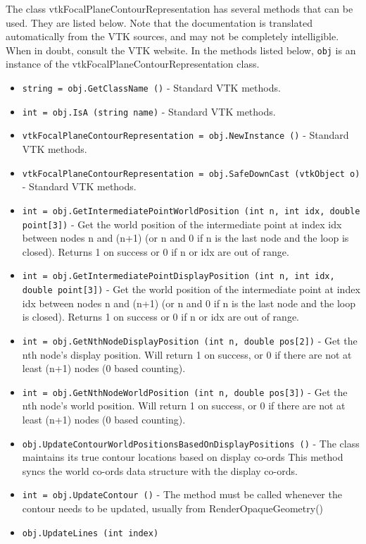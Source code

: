 The class vtkFocalPlaneContourRepresentation has several methods that can be used.
  They are listed below.
Note that the documentation is translated automatically from the VTK sources,
and may not be completely intelligible.  When in doubt, consult the VTK website.
In the methods listed below, \verb|obj| is an instance of the vtkFocalPlaneContourRepresentation class.
\begin{itemize}
\item  \verb|string = obj.GetClassName ()| -  Standard VTK methods.

\item  \verb|int = obj.IsA (string name)| -  Standard VTK methods.

\item  \verb|vtkFocalPlaneContourRepresentation = obj.NewInstance ()| -  Standard VTK methods.

\item  \verb|vtkFocalPlaneContourRepresentation = obj.SafeDownCast (vtkObject o)| -  Standard VTK methods.

\item  \verb|int = obj.GetIntermediatePointWorldPosition (int n, int idx, double point[3])| -  Get the world position of the intermediate point at
 index idx between nodes n and (n+1) (or n and 0 if
 n is the last node and the loop is closed). Returns
 1 on success or 0 if n or idx are out of range.

\item  \verb|int = obj.GetIntermediatePointDisplayPosition (int n, int idx, double point[3])| -  Get the world position of the intermediate point at
 index idx between nodes n and (n+1) (or n and 0 if
 n is the last node and the loop is closed). Returns
 1 on success or 0 if n or idx are out of range.

\item  \verb|int = obj.GetNthNodeDisplayPosition (int n, double pos[2])| -  Get the nth node's display position. Will return
 1 on success, or 0 if there are not at least 
 (n+1) nodes (0 based counting).

\item  \verb|int = obj.GetNthNodeWorldPosition (int n, double pos[3])| -  Get the nth node's world position. Will return
 1 on success, or 0 if there are not at least 
 (n+1) nodes (0 based counting).

\item  \verb|obj.UpdateContourWorldPositionsBasedOnDisplayPositions ()| -  The class maintains its true contour locations based on display co-ords
 This method syncs the world co-ords data structure with the display co-ords.

\item  \verb|int = obj.UpdateContour ()| -  The method must be called whenever the contour needs to be updated, usually
 from RenderOpaqueGeometry()

\item  \verb|obj.UpdateLines (int index)|

\end{itemize}
